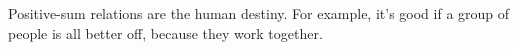 Positive-sum relations are the human destiny. For example, it's good if a group of people is all better off, because they work together.

